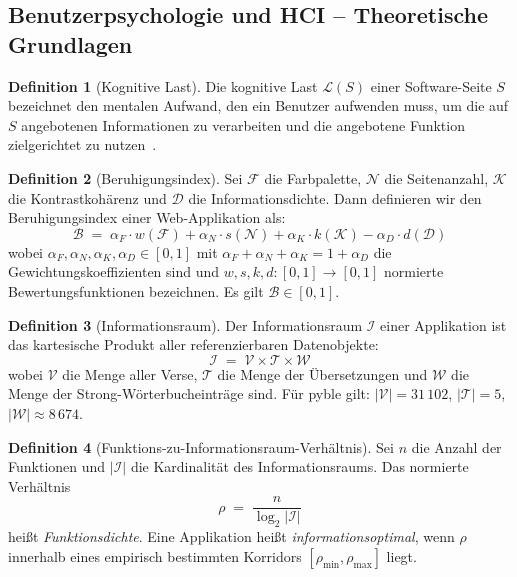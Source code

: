 ﻿\documentclass[a4paper,12pt]{article}
\theoremstyle{definition}
\newtheorem{definition}{Definition}
\begin{document}
\subsection{Benutzerpsychologie und HCI -- Theoretische Grundlagen}

\begin{definition}[Kognitive Last]
    Die kognitive Last $\mathcal{L}(S)$ einer Software-Seite $S$ bezeichnet den
    mentalen Aufwand, den ein Benutzer aufwenden muss, um die auf $S$ angebotenen
    Informationen zu verarbeiten und die angebotene Funktion zielgerichtet zu
    nutzen~\cite{sweller1988}.
\end{definition}

\begin{definition}[Beruhigungsindex]
\label{def:beruhigung}
    Sei $\mathcal{F}$ die Farbpalette, $\mathcal{N}$ die Seitenanzahl, $\mathcal{K}$
    die Kontrastkohärenz und $\mathcal{D}$ die Informationsdichte. Dann definieren
    wir den Beruhigungsindex einer Web-Applikation als:
    \[
        \mathcal{B} \;=\; \alpha_F \cdot w(\mathcal{F})
                        + \alpha_N \cdot s(\mathcal{N})
                        + \alpha_K \cdot k(\mathcal{K})
                        - \alpha_D \cdot d(\mathcal{D})
    \]
    wobei $\alpha_F, \alpha_N, \alpha_K, \alpha_D \in [0,1]$ mit
    $\alpha_F + \alpha_N + \alpha_K = 1 + \alpha_D$ die Gewichtungskoeffizienten
    sind und $w, s, k, d : [0,1] \to [0,1]$ normierte Bewertungsfunktionen
    bezeichnen. Es gilt $\mathcal{B} \in [0,1]$.
\end{definition}

\begin{definition}[Informationsraum]
    Der Informationsraum $\mathcal{I}$ einer Applikation ist das kartesische Produkt
    aller referenzierbaren Datenobjekte:
    \[
        \mathcal{I} \;=\; \mathcal{V} \times \mathcal{T} \times \mathcal{W}
    \]
    wobei $\mathcal{V}$ die Menge aller Verse, $\mathcal{T}$ die Menge der
    Übersetzungen und $\mathcal{W}$ die Menge der Strong-Wörterbucheinträge sind.
    Für pyble gilt: $|\mathcal{V}| = 31\,102$, $|\mathcal{T}| = 5$,
    $|\mathcal{W}| \approx 8\,674$.
\end{definition}

\begin{definition}[Funktions-zu-Informationsraum-Verhältnis]
\label{def:fi}
    Sei $n$ die Anzahl der Funktionen und $|\mathcal{I}|$ die Kardinalität des
    Informationsraums. Das normierte Verhältnis
    \[
        \rho \;=\; \frac{n}{\log_2 |\mathcal{I}|}
    \]
    heißt \emph{Funktionsdichte}. Eine Applikation heißt \emph{informationsoptimal},
    wenn $\rho$ innerhalb eines empirisch bestimmten Korridors
    $[\rho_{\min}, \rho_{\max}]$ liegt.
\end{definition}
\end{document}
